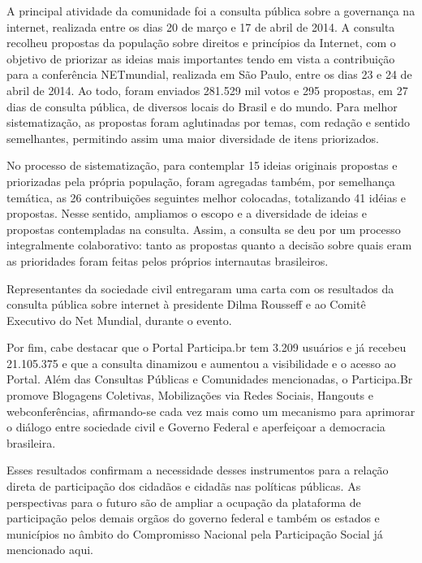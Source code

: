 \documentclass{article}
\begin{document}
\begin{description}
  A principal atividade da comunidade foi a consulta pública sobre a governança
  na internet, realizada entre os dias 20 de março e 17 de abril de 2014. A
  consulta recolheu propostas da população sobre direitos e princípios da
  Internet, com o objetivo de priorizar as ideias mais importantes tendo em
  vista a contribuição para a conferência NETmundial, realizada em São Paulo,
  entre os dias 23 e 24 de abril de 2014.  Ao todo, foram enviados 281.529 mil
  votos e 295 propostas, em 27 dias de consulta pública, de diversos locais do
  Brasil e do mundo. Para melhor sistematização, as propostas foram aglutinadas
  por temas, com redação e sentido semelhantes, permitindo assim uma maior
  diversidade de itens priorizados.  

  No processo de sistematização, para contemplar 15 ideias originais propostas
  e priorizadas pela própria população, foram agregadas também, por semelhança
  temática, as 26 contribuições seguintes melhor colocadas, totalizando 41
  idéias e propostas. Nesse sentido, ampliamos o escopo e a diversidade de
  ideias e propostas contempladas na consulta. Assim, a consulta se deu por um
  processo integralmente colaborativo: tanto as propostas quanto a decisão
  sobre quais eram as prioridades foram feitas pelos próprios internautas
  brasileiros. 

  Representantes da sociedade civil entregaram uma carta com os resultados da
  consulta pública sobre internet à presidente Dilma Rousseff e ao Comitê
  Executivo do Net Mundial, durante o evento.

\end{description}

Por fim, cabe destacar que o Portal Participa.br tem 3.209 usuários e já
recebeu 21.105.375 e que a consulta dinamizou e aumentou a visibilidade e o
acesso ao Portal. Além das Consultas Públicas e Comunidades mencionadas, o
Participa.Br promove Blogagens Coletivas, Mobilizações via Redes Sociais,
Hangouts e webconferências, afirmando-se cada vez mais como um mecanismo para
aprimorar o diálogo entre sociedade civil e Governo Federal e aperfeiçoar a
democracia brasileira.

Esses resultados confirmam a necessidade desses instrumentos para a relação
direta de participação dos cidadãos e cidadãs nas políticas públicas. As
perspectivas para o futuro são de ampliar a ocupação da plataforma de
participação pelos demais orgãos do governo federal e também os estados e
municípios no âmbito do Compromisso Nacional pela Participação Social já
mencionado aqui.
\end{document}
